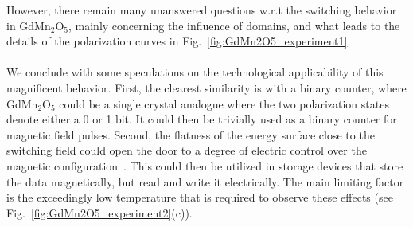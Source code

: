 However, there remain many unanswered questions w.r.t the switching behavior in GdMn$_2$O$_5$, mainly concerning the influence of domains, and what leads to the details of the polarization curves in Fig.~\ref{fig:GdMn2O5_experiment1}.
\\\\
We conclude with some speculations on the technological applicability of this magnificent behavior.
First, the clearest similarity is with a binary counter, where GdMn$_2$O$_5$ could be a single crystal analogue where the two polarization states denote either a 0 or 1 bit.
It could then be trivially used as a binary counter for magnetic field pulses.
Second, the flatness of the energy surface close to the switching field could open the door to a degree of electric control over the magnetic configuration~\cite{Radaelli08Y,Oh14}.
This could then be utilized in storage devices that store the data magnetically, but read and write it electrically.
The main limiting factor is the exceedingly low temperature that is required to observe these effects (see Fig.~\ref{fig:GdMn2O5_experiment2}(c)).
